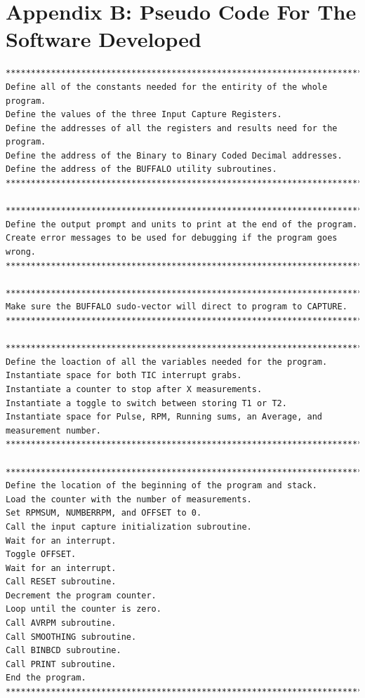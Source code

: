 \documentclass[12pt]{report}
\begin{document}
\section*{Appendix B: Pseudo Code For The Software Developed}
	\begin{Verbatim}[frame=single, fontsize=\footnotesize]
****************************************************************************************
Define all of the constants needed for the entirity of the whole program.
Define the values of the three Input Capture Registers.
Define the addresses of all the registers and results need for the program.
Define the address of the Binary to Binary Coded Decimal addresses.
Define the address of the BUFFALO utility subroutines.
****************************************************************************************

****************************************************************************************
Define the output prompt and units to print at the end of the program.
Create error messages to be used for debugging if the program goes wrong.
****************************************************************************************

****************************************************************************************
Make sure the BUFFALO sudo-vector will direct to program to CAPTURE.
****************************************************************************************

****************************************************************************************
Define the loaction of all the variables needed for the program.
Instantiate space for both TIC interrupt grabs.
Instantiate a counter to stop after X measurements.
Instantiate a toggle to switch between storing T1 or T2.
Instantiate space for Pulse, RPM, Running sums, an Average, and measurement number.
****************************************************************************************

****************************************************************************************
Define the location of the beginning of the program and stack.
Load the counter with the number of measurements.
Set RPMSUM, NUMBERRPM, and OFFSET to 0.
Call the input capture initialization subroutine.
Wait for an interrupt.
Toggle OFFSET.
Wait for an interrupt.
Call RESET subroutine.
Decrement the program counter.
Loop until the counter is zero.
Call AVRPM subroutine.
Call SMOOTHING subroutine.
Call BINBCD subroutine.
Call PRINT subroutine.
End the program.
****************************************************************************************


\end{Verbatim}
\end{document}

